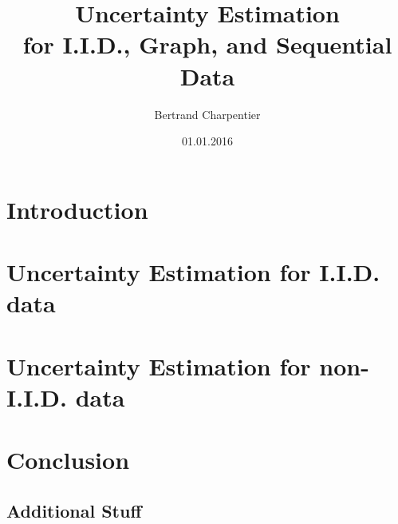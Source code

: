 \documentclass[%
]{tumDiss}
\title{%
  Uncertainty Estimation\\ 
  for I.I.D., Graph, and Sequential Data\\
}
\author{Bertrand Charpentier}
\date{01.01.2016}
\begin{document}
\frontmatter
\maketitle







\tableofcontents


\mainmatter
\part{Introduction}



\part{Uncertainty Estimation for I.I.D. data}




\part{Uncertainty Estimation for non-I.I.D. data}




\part{Conclusion}



%







\appendix
\chapter{Additional Stuff}

\lipsum[1-4]
\end{document}

